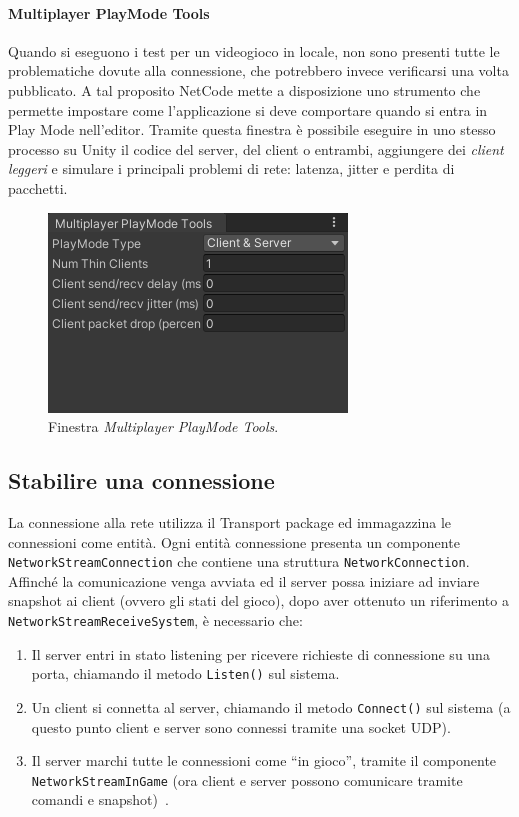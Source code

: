 \paragraph{Multiplayer PlayMode Tools}
Quando si eseguono i test per un videogioco in locale, non sono presenti tutte le problematiche dovute alla connessione, che potrebbero invece verificarsi una volta pubblicato. A tal proposito NetCode mette a disposizione uno strumento che permette impostare come l'applicazione si deve comportare quando si entra in Play Mode nell'editor. Tramite questa finestra è possibile eseguire in uno stesso processo su Unity il codice del server, del client o entrambi, aggiungere dei \emph{client leggeri} e simulare i principali problemi di rete: latenza, jitter e perdita di pacchetti.

\begin{figure}[!ht]
    \centering
    \includegraphics[width=0.50\columnwidth]{gfx/imgs/chapter3/MultiplayerPlayModeTools.png}
    \caption{Finestra \emph{Multiplayer PlayMode Tools}.}
    \label{fig:multiplayer-playmode-tools}
\end{figure}

\subsection{Stabilire una connessione}
\label{subsec:netcode-stabilire-connessione}
La connessione alla rete utilizza il Transport package ed immagazzina le connessioni come entità. Ogni entità connessione presenta un componente \verb|NetworkStreamConnection| che contiene una struttura \verb|NetworkConnection|.
Affinché la comunicazione venga avviata ed il server possa iniziare ad inviare snapshot ai client (ovvero gli stati del gioco), dopo aver ottenuto un riferimento a \verb|NetworkStreamReceiveSystem|, è necessario che:
\begin{enumerate}
    \item Il server entri in stato listening per ricevere richieste di connessione su una porta, chiamando il metodo \verb|Listen()| sul sistema.
    \item Un client si connetta al server, chiamando il metodo \verb|Connect()| sul sistema (a questo punto client e server sono connessi tramite una socket UDP).
    \item Il server marchi tutte le connessioni come ``in gioco'', tramite il componente \verb|NetworkStreamInGame| (ora client e server possono comunicare tramite comandi e snapshot)~\cite{doc:unity-netcode-manual}.
\end{enumerate}

